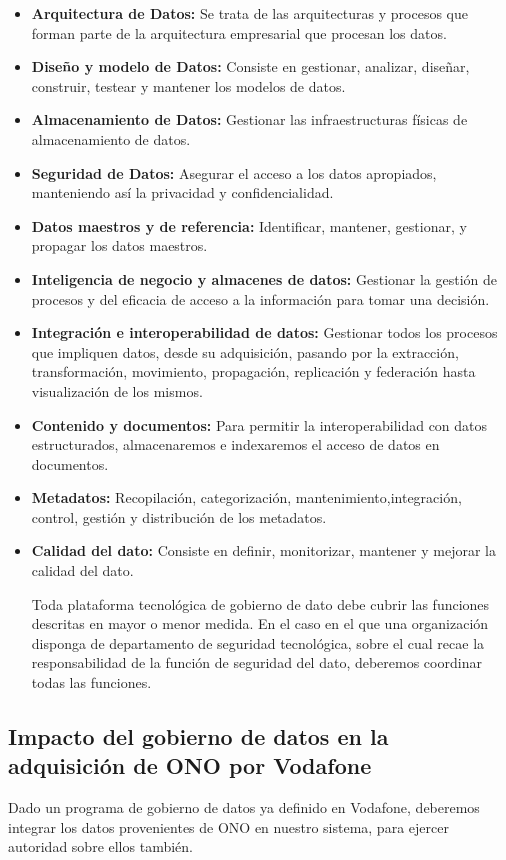\documentclass{article}
\begin{document}
\begin{itemize}
\item \textbf{Arquitectura de Datos:} Se trata de las arquitecturas y procesos que forman parte de la arquitectura empresarial que procesan los datos.
\item \textbf{Diseño y modelo de Datos:} Consiste en gestionar, analizar, diseñar, construir, testear y mantener los modelos de datos.
\item \textbf{Almacenamiento de Datos:} Gestionar las infraestructuras físicas de almacenamiento de datos.
\item \textbf{Seguridad de Datos:} Asegurar el acceso a los datos apropiados, manteniendo así la privacidad y confidencialidad.
\item \textbf{Datos maestros y de referencia:} Identificar, mantener, gestionar, y propagar los datos maestros.
\item \textbf{Inteligencia de negocio y almacenes de datos:} Gestionar la gestión de procesos y del eficacia de acceso a la información para tomar una decisión.
\item \textbf{Integración e interoperabilidad de datos:} Gestionar todos los procesos que impliquen datos, desde su adquisición, pasando por la extracción, transformación, movimiento, propagación, replicación y federación hasta visualización de los mismos.
\item \textbf{Contenido y documentos:} Para permitir la interoperabilidad con datos estructurados, almacenaremos e indexaremos el acceso de datos en documentos.
\item \textbf{Metadatos:} Recopilación, categorización, mantenimiento,integración, control, gestión y distribución de los metadatos.
\item \textbf{Calidad del dato:} Consiste en definir, monitorizar, mantener y mejorar la calidad del dato.

Toda plataforma tecnológica de gobierno de dato debe cubrir las funciones descritas en mayor o menor medida. En el caso en el que una organización disponga de departamento de seguridad tecnológica, sobre el cual recae la responsabilidad de la función de seguridad del dato, deberemos coordinar todas las funciones.


\end{itemize}
\subsection{Impacto del gobierno de datos en la adquisición de ONO por Vodafone}
Dado un programa de gobierno de datos ya definido en Vodafone, deberemos integrar los datos provenientes de ONO en nuestro sistema, para ejercer autoridad sobre ellos también. 
\end{document}
